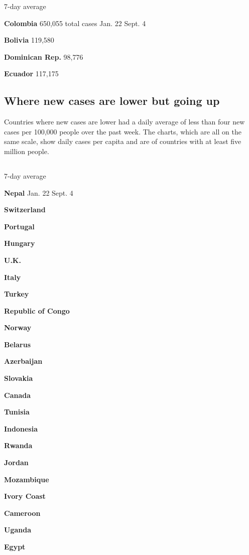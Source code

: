 7-day average

\textbf{Colombia} 650,055 total cases Jan. 22 Sept. 4

\textbf{Bolivia} 119,580

\textbf{Dominican Rep.} 98,776

\textbf{Ecuador} 117,175

\hypertarget{where-new-cases-are-lower-but-going-up}{%
\subsection{Where new cases are lower but going
up}\label{where-new-cases-are-lower-but-going-up}}

Countries where new cases are lower had a daily average of less than
four new cases per 100,000 people over the past week. The charts, which
are all on the same scale, show daily cases per capita and are of
countries with at least five million people.

\hypertarget{-1}{%
\subsection{}\label{-1}}

7-day average

\textbf{Nepal} Jan. 22 Sept. 4

\textbf{Switzerland}

\textbf{Portugal}

\textbf{Hungary}

\textbf{U.K.}

\textbf{Italy}

\textbf{Turkey}

\textbf{Republic of Congo}

\textbf{Norway}

\textbf{Belarus}

\textbf{Azerbaijan}

\textbf{Slovakia}

\textbf{Canada}

\textbf{Tunisia}

\textbf{Indonesia}

\textbf{Rwanda}

\textbf{Jordan}

\textbf{Mozambique}

\textbf{Ivory Coast}

\textbf{Cameroon}

\textbf{Uganda}

\textbf{Egypt}

